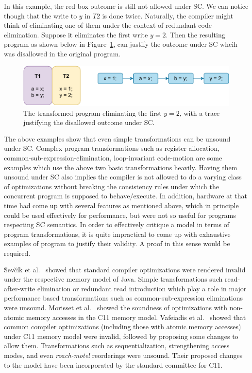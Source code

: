     In this example, the red box outcome is still not allowed under SC. We can notice though that the write to $y$ in $T2$ is done twice. 
    Naturally, the compiler might think of eliminating one of them under the context of redundant code-elimination. 
    Suppose it eliminates the first write $y=2$. 
    Then the resulting program as shown below in Figure~\ref{intro:Example3(b)}, can justify the outcome under SC whcih was disallowed in the original program.
    \begin{figure}[H]
        \centering
        \includegraphics[scale=0.7]{2.Background/SC_Example2(b).pdf}
        \caption{The transformed program eliminating the first $y=2$, with a trace justifying the disallowed outcome under SC.}
        \label{intro:Example3(b)}
    \end{figure}

    The above examples show that even simple transformations can be unsound under SC. Complex program transformations such as register allocation, common-sub-expression-elimination, loop-invariant code-motion are some examples which use the above two basic transformations heavily. 
    Having them unsound under SC also implies the compiler is not allowed to do a varying class of optimizations without breaking the consistency rules under which the concurrent program is supposed to behave/execute. 
    In addition, hardware at that time had come up with several features as mentioned above, which in principle could be used effectively for performance, but were not so useful for programs respecting SC semantics. 
    In order to effectively critique a model in terms of program transformations, it is quite impractical to come up with exhaustive examples of program to justify their validity.
    A proof in this sense would be required.  

    \u{S}ev\u{c}\'{i}k et al.~\cite{SevcikJ} showed that standard compiler optimizations were rendered invalid under the respective memory model of Java. Simple transformations such read-after-write elimination or redundant read introduction which play a role in major performance based transformations such as common-sub-expression eliminations were unsound. 
    Morisset et al.~\cite{Morisset} showed the soundness of optimizations with non-atomic memory accesses in the C11 memory model. 
    Vafeiadis et al.~\cite{VafeiadisV} showed that common compiler optimizations (including those with atomic memory accesses) under C11 memory model were invalid, followed by proposing some changes to allow them. 
    Transformations such as sequentialization, strengthening access modes, and even \textit{roach-motel} reorderings were unsound. Their proposed changes to the model have been incorporated by the standard committee for C11. 

